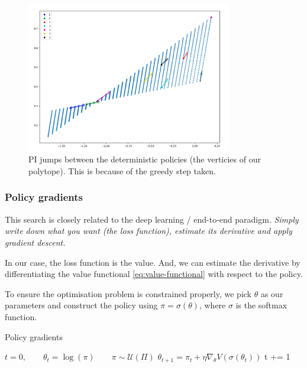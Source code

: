 \begin{figure}[h!]
\centering
\includegraphics[width=0.8\textwidth,height=0.4\textheight]{../../pictures/figures/pi-polytope.png}
\caption{PI jumps between the deterministic policies (the verticies of our polytope).
This is because of the greedy step taken.}
\end{figure}

\newpage

\subsubsection{Policy gradients}

This search is closely related to the deep learning / end-to-end paradigm.
\textit{Simply write down what you want (the loss function),
estimate its derivative and apply gradient descent.}

In our case, the loss function is the value. And, we can estimate the derivative
by differentiating the value functional \ref{eq:value-functional} with respect to the policy.

To ensure the optimisation problem is constrained properly, we pick $\theta$ as our parameters and
construct the policy using $\pi = \sigma(\theta)$, where $\sigma$ is the softmax function.


\begin{algorithm}
\caption{Policy gradients}
\begin{algorithmic}[1]

  \State $t=0, \quad\quad \theta_t = \log(\pi) \quad\quad \pi \sim \mathcal U(\Pi)$ 
    \State $\theta_{t+1} = \pi_t + \eta \nabla_{\theta} V(\sigma(\theta_t))$ 
    \State t += 1
  \EndWhile
  \State {}
\EndProcedure

\end{algorithmic}
\end{algorithm}

